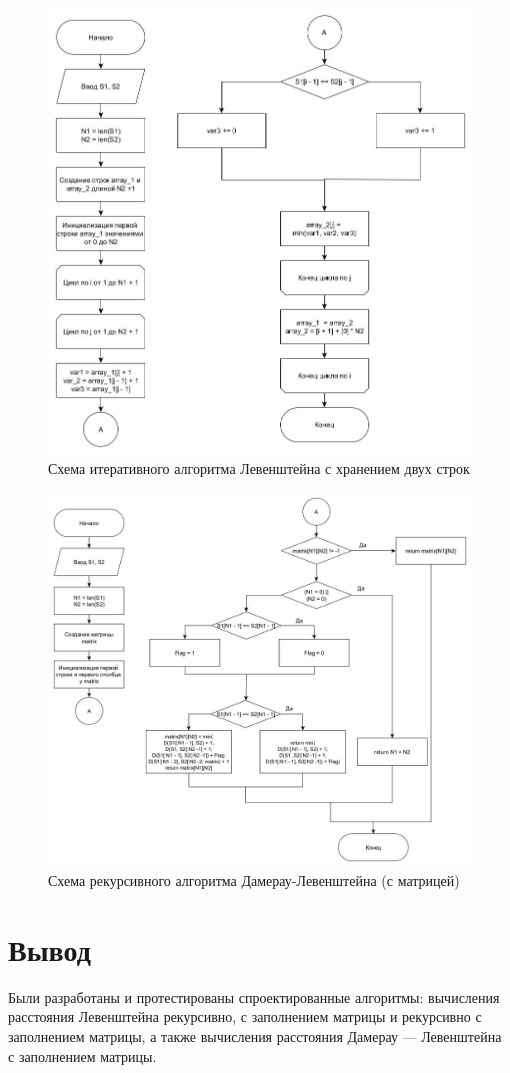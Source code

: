 \begin{figure}[hp]
    \begin{center}
        \includegraphics[width=\linewidth]{graph/LevenMatr.jpg}
    \end{center}
    \caption{Схема итеративного алгоритма Левенштейна с хранением двух строк}
\end{figure}

\begin{figure}[hp]
    \begin{center}
        \includegraphics[width=\linewidth]{graph/Damerau.jpg}
    \end{center}
    \caption{Схема рекурсивного алгоритма Дамерау-Левенштейна (с матрицей)}
\end{figure}


\clearpage

\section{Вывод}
Были разработаны и протестированы спроектированные алгоритмы: вычисления расстояния Левенштейна рекурсивно, с заполнением матрицы и рекурсивно с заполнением матрицы, а также вычисления расстояния Дамерау — Левенштейна с заполнением матрицы.
